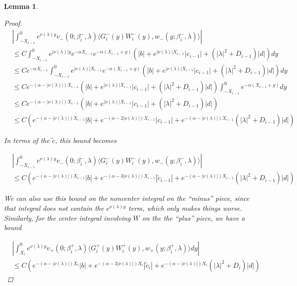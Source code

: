 \documentclass[12pt]{article}
\newtheorem{lemma}{Lemma}
\begin{document}
\begin{lemma}
\begin{proof}
\begin{align*}
&\left| \int_{-X_{i-1}}^0
e^{\nu(\lambda)y} v_-(0; \beta_i^-, \lambda) \langle G_i^-(y)W_i^-(y), w_-(y; \beta_i^-, \lambda) \rangle \right| \\
&\leq C \int_{-X_{i-1}}^0 e^{|\nu(\lambda)|y} e^{-\alpha X_{i-1}} e^{-\alpha(X_{i-1} + y)} ( |b| + e^{|\nu(\lambda)|X_{i-1}}|c_{i-1}| + (|\lambda|^2 + D_{i-1})|d| )dy \\
&\leq C e^{-\alpha X_{i-1}} \int_{-X_{i-1}}^0 e^{|\nu(\lambda)|X_{i-1}} e^{-\alpha(X_{i-1} + y)} ( |b| + e^{|\nu(\lambda)|X_{i-1}}|c_{i-1}| + (|\lambda|^2 + D_{i-1})|d| )dy \\
&\leq C e^{-(\alpha - |\nu(\lambda)|) X_{i-1}} ( |b| + e^{|\nu(\lambda)|X_{i-1}}|c_{i-1}| + (|\lambda|^2 + D_{i-1})|d| ) \int_{-X_{i-1}}^0 e^{-\alpha(X_{i-1} + y)} dy \\
&\leq C e^{-(\alpha - |\nu(\lambda)|) X_{i-1}} ( |b| + e^{|\nu(\lambda)|X_{i-1}}|c_{i-1}| + (|\lambda|^2 + D_{i-1})|d| ) \\
&\leq C ( e^{-(\alpha - |\nu(\lambda)|) X_{i-1}} |b| + e^{-(\alpha - 2 |\nu(\lambda)|) X_{i-1}}|c_{i-1}| + e^{-(\alpha - |\nu(\lambda)|) X_{i-1}} (|\lambda|^2 + D_{i-1})|d| )
\end{align*}

In terms of the $\tilde{c}$, this bound becomes

\begin{align*}
&\left| \int_{-X_{i-1}}^0
e^{\nu(\lambda)y} v_-(0; \beta_i^-, \lambda) \langle G_i^-(y)W_i^-(y), w_-(y; \beta_i^-, \lambda) \rangle \right| \\
&\leq C ( e^{-(\alpha - |\nu(\lambda)|) X_{i-1}} |b| + e^{-(\alpha - 3 |\nu(\lambda)|) X_{i-1}}|\tilde{c}_{i-1}| + e^{-(\alpha - |\nu(\lambda)|) X_{i-1}} (|\lambda|^2 + D_{i-1})|d| )
\end{align*}

We can also use this bound on the noncenter integral on the ``minus'' piece, since that integral does not contain the $e^{\nu(\lambda)y}$ term, which only makes things worse. \\

Similarly, for the center integral involving $W$ on the the ``plus'' piece, we have a bound

\begin{align*}
&\left| \int_{X_i}^0 e^{\nu(\lambda)y} v_+(0; \beta_i^+, \lambda) \langle G_i^+(y)W_i^+(y), w_+(y; \beta_i^+, \lambda) \rangle dy \right| \\
&\leq C ( e^{-(\alpha - |\nu(\lambda)|) X_i} |b| + e^{-(\alpha - 3 |\nu(\lambda)|) X_i}|\tilde{c}_i| + e^{-(\alpha - |\nu(\lambda)|) X_i} (|\lambda|^2 + D_i)|d| )
\end{align*}


\end{proof}
\end{lemma}
\end{document}
